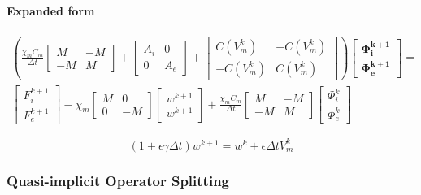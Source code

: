 \documentclass[a4paper]{article}
\begin{document}
\paragraph{Expanded form}
\begin{equation}
\begin{gathered}
\left( \frac{\chi_m C_m}{\Delta t} \begin{bmatrix} M & -M \\ -M & M \end{bmatrix} + \begin{bmatrix} A_i & 0 \\ 0 & A_e \end{bmatrix} + 
\begin{bmatrix}
C(V_m^k) & -C(V_m^k) \\ -C(V_m^k) & C(V_m^k)
\end{bmatrix}\right)
\begin{bmatrix} \bm{\Phi_i^{k+1}} \\ \bm{\Phi_e^{k+1}} \end{bmatrix} = 
\\
\begin{bmatrix} F_i^{k+1} \\ F_e^{k+1} \end{bmatrix} 
- \chi_m \begin{bmatrix}M & 0 \\ 0 & -M \end{bmatrix}
\begin{bmatrix} w^{k+1} \\ w^{k+1} \end{bmatrix}
+ \frac{\chi_m C_m}{\Delta t} \begin{bmatrix}M & -M \\ -M & M\end{bmatrix}
\begin{bmatrix} \Phi_i^{k} \\ \Phi_e^{k} \end{bmatrix}
\end{gathered}
\end{equation}

\vspace{5mm}
\begin{equation}
(1+\epsilon \gamma \Delta t)w^{k+1} = w^k + \epsilon \Delta t V_m^k
\end{equation}

\newpage
\subsubsection{Quasi-implicit Operator Splitting}
\end{document}
